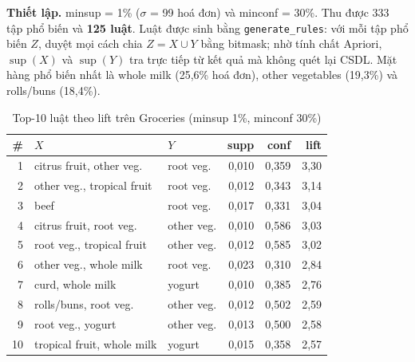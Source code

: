 \documentclass[10pt,twocolumn,letterpaper]{article}
\renewcommand{\sup}{\operatorname{sup}}
\begin{document}
\textbf{Thiết lập.} minsup = 1\% ($\sigma$ = 99 hoá đơn) và minconf = 30\%. Thu được 333 tập phổ biến và \textbf{125 luật}. Luật được sinh bằng \texttt{generate\_rules}: với mỗi tập phổ biến $Z$, duyệt mọi cách chia $Z=X\cup Y$ bằng bitmask; nhờ tính chất Apriori, $\sup(X)$ và $\sup(Y)$ tra trực tiếp từ kết quả mà không quét lại CSDL. Mặt hàng phổ biến nhất là whole milk (25,6\% hoá đơn), other vegetables (19,3\%) và rolls/buns (18,4\%).

\begin{table}[t]
\centering
\caption{Top-10 luật theo lift trên Groceries (minsup 1\%, minconf 30\%)}
\label{tab:rules}
\scriptsize
\setlength{\tabcolsep}{3pt}
\begin{tabular}{@{}r>{\raggedright\arraybackslash}p{2.45cm}>{\raggedright\arraybackslash}p{1.5cm}rrr@{}}
\toprule
\# & $X$ & $Y$ & supp & conf & lift \\ \midrule
1 & citrus fruit, other veg. & root veg. & 0,010 & 0,359 & 3,30 \\
2 & other veg., tropical fruit & root veg. & 0,012 & 0,343 & 3,14 \\
3 & beef & root veg. & 0,017 & 0,331 & 3,04 \\
4 & citrus fruit, root veg. & other veg. & 0,010 & 0,586 & 3,03 \\
5 & root veg., tropical fruit & other veg. & 0,012 & 0,585 & 3,02 \\
6 & other veg., whole milk & root veg. & 0,023 & 0,310 & 2,84 \\
7 & curd, whole milk & yogurt & 0,010 & 0,385 & 2,76 \\
8 & rolls/buns, root veg. & other veg. & 0,012 & 0,502 & 2,59 \\
9 & root veg., yogurt & other veg. & 0,013 & 0,500 & 2,58 \\
10 & tropical fruit, whole milk & yogurt & 0,015 & 0,358 & 2,57 \\
\bottomrule
\end{tabular}
\end{table}
\end{document}
